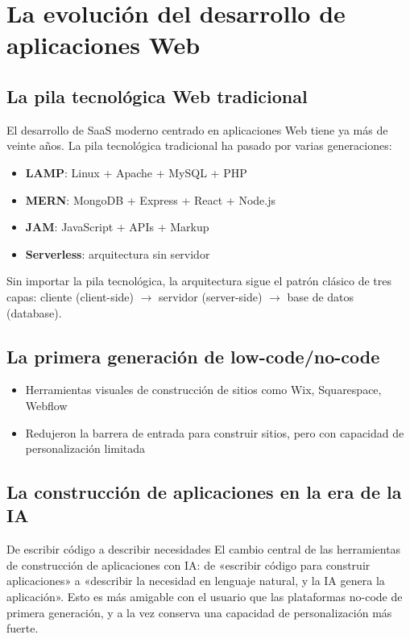\section{La evolución del desarrollo de aplicaciones Web}

\subsection{La pila tecnológica Web tradicional}

El desarrollo de SaaS moderno centrado en aplicaciones Web tiene ya más de veinte años. La pila tecnológica tradicional ha pasado por varias generaciones:

\begin{itemize}
    \item \textbf{LAMP}: Linux + Apache + MySQL + PHP
    \item \textbf{MERN}: MongoDB + Express + React + Node.js
    \item \textbf{JAM}: JavaScript + APIs + Markup
    \item \textbf{Serverless}: arquitectura sin servidor
\end{itemize}

Sin importar la pila tecnológica, la arquitectura sigue el patrón clásico de tres capas: cliente (client-side) $\rightarrow$ servidor (server-side) $\rightarrow$ base de datos (database).

\subsection{La primera generación de low-code/no-code}

\begin{itemize}
    \item Herramientas visuales de construcción de sitios como Wix, Squarespace, Webflow
    \item Redujeron la barrera de entrada para construir sitios, pero con capacidad de personalización limitada
\end{itemize}

\subsection{La construcción de aplicaciones en la era de la IA}

\begin{importantbox}{De escribir código a describir necesidades}
El cambio central de las herramientas de construcción de aplicaciones con IA: de «escribir código para construir aplicaciones» a «describir la necesidad en lenguaje natural, y la IA genera la aplicación». Esto es más amigable con el usuario que las plataformas no-code de primera generación, y a la vez conserva una capacidad de personalización más fuerte.
\end{importantbox}

